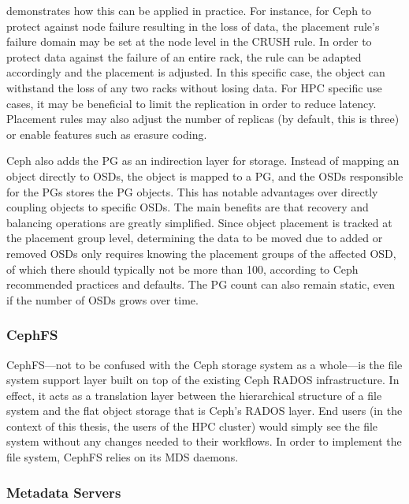  demonstrates how this can be applied in
practice. For instance, for Ceph to protect against node failure resulting in
the loss of data, the placement rule's failure domain may be set at the node
level in the \ac{CRUSH} rule. In order to protect data against the failure of an
entire rack, the rule can be adapted accordingly and the placement is adjusted.
In this specific case, the object can withstand the loss of any two racks
without losing data. For \ac{HPC} specific use cases, it may be beneficial to
limit the replication in order to reduce latency. Placement rules may also
adjust the number of replicas (by default, this is three) or enable features
such as erasure coding.

Ceph also adds the \ac{PG} as an indirection layer for storage. Instead of
mapping an object directly to \acp{OSD}, the object is mapped to a \ac{PG}, and
the \acp{OSD} responsible for the \acp{PG} stores the \ac{PG} objects. This has
notable advantages over directly coupling objects to specific \acp{OSD}. The
main benefits are that recovery and balancing operations are greatly simplified.
Since object placement is tracked at the placement group level, determining the
data to be moved due to added or removed \acp{OSD} only requires knowing the
placement groups of the affected \ac{OSD}, of which there should typically not be more
than 100, according to Ceph recommended practices and defaults. The \ac{PG}
count can also remain static, even if the number of \acp{OSD} grows over time.

\subsubsection{\acs{CephFS}}

\ac{CephFS}---not to be confused with the Ceph storage system as a whole---is the file system support layer built on top of the existing Ceph \ac{RADOS} infrastructure. In effect, it acts as a translation layer between the hierarchical structure of a file system and the flat object storage that is Ceph's \ac{RADOS} layer. End users (in the context of this thesis, the users of the \ac{HPC} cluster) would simply see the file system without any changes needed to their workflows. In order to implement the file system, \ac{CephFS} relies on its \ac{MDS} daemons.

\subsubsection*{Metadata Servers}


